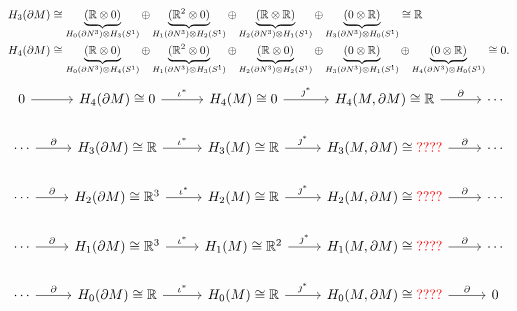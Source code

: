 \documentclass{article}
\begin{document}
\begin{example}
\begin{itemize}
\begin{align*}
    H_3(\partial M) &\cong \underbrace{(\mathbb{R} \otimes 0)}_{H_0(\partial N^3)\otimes H_3(S^1)} \oplus \underbrace{(\mathbb{R}^2 \otimes 0)}_{H_1(\partial N^3)\otimes H_2(S^1)} \oplus \underbrace{(\mathbb{R} \otimes \mathbb{R})}_{H_2(\partial N^3)\otimes H_1(S^1)} \oplus \underbrace{(0 \otimes \mathbb{R})}_{H_3(\partial N^3)\otimes H_0(S^1)} \cong \mathbb{R}\\
    H_4(\partial M) &\cong \underbrace{(\mathbb{R} \otimes 0)}_{H_0(\partial N^3)\otimes H_4(S^1)} \oplus \underbrace{(\mathbb{R}^2 \otimes 0)}_{H_1(\partial N^3)\otimes H_3(S^1)} \oplus \underbrace{(\mathbb{R} \otimes 0)}_{H_2(\partial N^3)\otimes H_2(S^1)} \oplus \underbrace{(0 \otimes \mathbb{R})}_{H_3(\partial N^3)\otimes H_1(S^1)} \oplus \underbrace{(0 \otimes \mathbb{R})}_{H_4(\partial N^3)\otimes H_0(S^1)} \cong 0.
\end{align*}
\[
\begin{tikzcd}
0 \arrow[r]                          & H_4(\partial M)\cong 0 \arrow[r, "\iota^*"]            & H_4(M)\cong 0 \arrow[r, "\jmath^*"]          & {H_4(M,\partial M)\cong \R} \arrow[r, "\partial"]          & \cdots \\
\cdots \arrow[r, "\partial"]                          & H_3(\partial M)\cong \R \arrow[r, "\iota^*"]            & H_3(M)\cong \R \arrow[r, "\jmath^*"]          & {H_3(M,\partial M)\cong \textcolor{red}{????}} \arrow[r, "\partial"]          & \cdots \\
\cdots \arrow[r, "\partial"] & H_2(\partial M)\cong \mathbb{R}^3 \arrow[r, "\iota^*"]   & H_2(M) \cong \R \arrow[r, "\jmath^*"]         & {H_2(M,\partial M)\cong \textcolor{red}{????}} \arrow[r, "\partial"] & \cdots \\
\cdots \arrow[r, "\partial"] & H_1(\partial M)\cong \mathbb{R}^3 \arrow[r, "\iota^*"] & H_1(M)\cong \mathbb{R}^2 \arrow[r, "\jmath^*"] & {H_1(M,\partial M)\cong\textcolor{red}{????}} \arrow[r, "\partial"]          & \cdots \\
\cdots \arrow[r, "\partial"] & H_0(\partial M)\cong \mathbb{R} \arrow[r, "\iota^*"]   & H_0(M)\cong \mathbb{R} \arrow[r, "\jmath^*"] & {H_0(M,\partial M)\cong \textcolor{red}{????}} \arrow[r, "\partial"]          & 0     
\end{tikzcd}
\]
\end{itemize}


\end{example}
\end{document}
